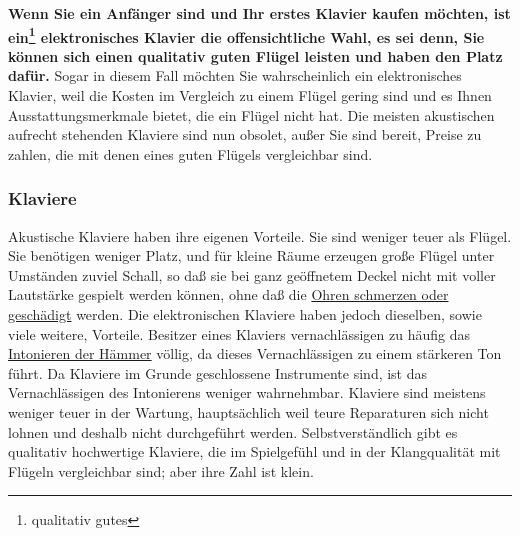 \textbf{Wenn Sie ein Anfänger sind und Ihr erstes Klavier kaufen möchten, ist ein\footnote{qualitativ gutes} elektronisches Klavier die offensichtliche Wahl, es sei denn, Sie können sich einen qualitativ guten Flügel leisten und haben den Platz dafür.}
Sogar in diesem Fall möchten Sie wahrscheinlich ein elektronisches Klavier, weil die Kosten im Vergleich zu einem Flügel gering sind und es Ihnen Ausstattungsmerkmale bietet, die ein Flügel nicht hat.
Die meisten akustischen aufrecht stehenden Klaviere sind nun obsolet, außer Sie sind bereit, Preise zu zahlen, die mit denen eines guten Flügels vergleichbar sind.


\subsubsection{Klaviere}
\label{c1iii17c}

Akustische Klaviere haben ihre eigenen Vorteile.
Sie sind weniger teuer als Flügel.
Sie benötigen weniger Platz, und für kleine Räume erzeugen große Flügel unter Umständen zuviel Schall, so daß sie bei ganz geöffnetem Deckel nicht mit voller Lautstärke gespielt werden können, ohne daß die \hyperref[c1iii10gehoer]{Ohren schmerzen oder geschädigt} werden.
Die elektronischen Klaviere haben jedoch dieselben, sowie viele weitere, Vorteile.
Besitzer eines Klaviers vernachlässigen zu häufig das \hyperref[c2_7_hamm]{Intonieren der Hämmer} völlig, da dieses Vernachlässigen zu einem stärkeren Ton führt.
Da Klaviere im Grunde geschlossene Instrumente sind, ist das Vernachlässigen des Intonierens weniger wahrnehmbar.
Klaviere sind meistens weniger teuer in der Wartung, hauptsächlich weil teure Reparaturen sich nicht lohnen und deshalb nicht durchgeführt werden.
Selbstverständlich gibt es qualitativ hochwertige Klaviere, die im Spielgefühl und in der Klangqualität mit Flügeln vergleichbar sind; aber ihre Zahl ist klein.

